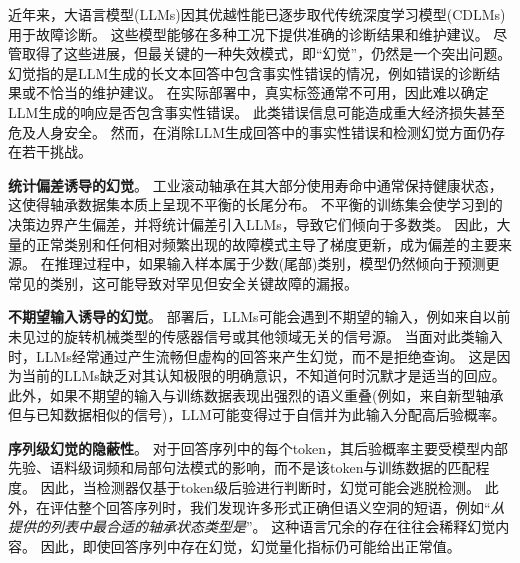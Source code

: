 \documentclass[UTF8,lettersize,journal]{IEEEtran}
\begin{document}
近年来，大语言模型(LLMs)因其优越性能已逐步取代传统深度学习模型(CDLMs)用于故障诊断\cite{Peng_Liu_Du_Gao_Wang_2025}。
这些模型能够在多种工况下提供准确的诊断结果和维护建议。
尽管取得了这些进展，但最关键的一种失效模式，即``幻觉''，仍然是一个突出问题。
幻觉指的是LLM生成的长文本回答中包含事实性错误的情况，例如错误的诊断结果或不恰当的维护建议\cite{li-etal-2023-halueval, azaria-mitchell-2023-internal}。
在实际部署中，真实标签通常不可用，因此难以确定LLM生成的响应是否包含事实性错误。
此类错误信息可能造成重大经济损失甚至危及人身安全。
然而，在消除LLM生成回答中的事实性错误和检测幻觉方面仍存在若干挑战。

\textbf{统计偏差诱导的幻觉}。
工业滚动轴承在其大部分使用寿命中通常保持健康状态，这使得轴承数据集本质上呈现不平衡的长尾分布。
不平衡的训练集会使学习到的决策边界产生偏差，并将统计偏差引入LLMs，导致它们倾向于多数类。
因此，大量的正常类别和任何相对频繁出现的故障模式主导了梯度更新，成为偏差的主要来源。
在推理过程中，如果输入样本属于少数(尾部)类别，模型仍然倾向于预测更常见的类别，这可能导致对罕见但安全关键故障的漏报。


\textbf{不期望输入诱导的幻觉}。
部署后，LLMs可能会遇到不期望的输入，例如来自以前未见过的旋转机械类型的传感器信号或其他领域无关的信号源。
当面对此类输入时，LLMs经常通过产生流畅但虚构的回答来产生幻觉，而不是拒绝查询。
这是因为当前的LLMs缺乏对其认知极限的明确意识，不知道何时沉默才是适当的回应。
此外，如果不期望的输入与训练数据表现出强烈的语义重叠(例如，来自新型轴承但与已知数据相似的信号)，LLM可能变得过于自信并为此输入分配高后验概率。


\textbf{序列级幻觉的隐蔽性}。
对于回答序列中的每个token，其后验概率主要受模型内部先验、语料级词频和局部句法模式的影响，而不是该token与训练数据的匹配程度。
因此，当检测器仅基于token级后验进行判断时，幻觉可能会逃脱检测。
此外，在评估整个回答序列时，我们发现许多形式正确但语义空洞的短语，例如``\textit{从提供的列表中最合适的轴承状态类型是}''。
这种语言冗余的存在往往会稀释幻觉内容。
因此，即使回答序列中存在幻觉，幻觉量化指标仍可能给出正常值。
\end{document}
